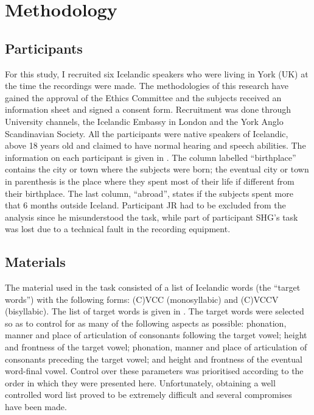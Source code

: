 \chapter{Methodology}

\section{Participants}

For this study, I recruited six Icelandic speakers who were living in York (UK) at the time the recordings were made.
The methodologies of this research have gained the approval of the Ethics Committee and the subjects received an information sheet and signed a consent form.
Recruitment was done through University channels, the Icelandic Embassy in London and the York Anglo Scandinavian Society.
All the participants were native speakers of Icelandic, above 18 years old and claimed to have normal hearing and speech abilities.
The information on each participant is given in .
The column labelled ``birthplace'' contains the city or town where the subjects were born; the eventual city or town in parenthesis is the place where they spent most of their life if different from their birthplace.
The last column, ``abroad'', states if the subjects spent more that 6 months outside Iceland.
Participant JR had to be excluded from the analysis since he misunderstood the task, while part of participant SHG's task was lost due to a technical fault in the recording equipment.



\section{Materials}

The material used in the task consisted of a list of Icelandic words (the ``target words'') with the following forms: (C)VCC (monosyllabic) and (C)VCCV (bisyllabic).
The list of target words is given in .
The target words were selected so as to control for as many of the following aspects as possible: phonation, manner and place of articulation of consonants following the target vowel; height and frontness of the target vowel; phonation, manner and place of articulation of consonants preceding the target vowel; and height and frontness of the eventual word-final vowel.
Control over these parameters was prioritised according to the order in which they were presented here.
Unfortunately, obtaining a well controlled word list proved to be extremely difficult and several compromises have been made.


